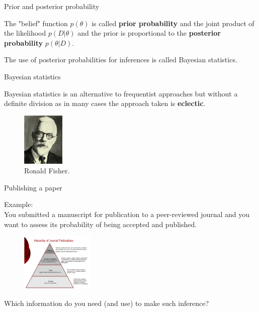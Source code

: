 \begin{frame}{Prior and posterior probability}

	\begin{block}{}
		The "belief" function $p(\theta)$ is called \textbf{prior probability} and the 
		joint product of the likelihood $p(D|\theta)$ and the prior is proportional 
		to the \textbf{posterior probability} $p(\theta|D)$.
	\end{block}

	\begin{block}{}
		The use of posterior probabilities for inferences is called Bayesian statistics.
	\end{block}

\end{frame}

\begin{frame}{Bayesian statistics}

	Bayesian statistics is an alternative to frequentist approaches but without a definite division as in many cases 
	the approach taken is \textbf{eclectic}.

	\begin{figure}[!ht]
		\includegraphics[width=2cm]{Images/Ronald_Fisher.jpg}
		\caption{Ronald Fisher.}
	\end{figure}

\end{frame}

\begin{frame}{Publishing a paper}

	Example:\\
	You submitted a manuscript for publication to a peer-reviewed journal and you want to assess its probability 
	of being accepted and published.

	\begin{figure}[!ht]
         	\includegraphics[width=3.5cm]{Images/journals.png}
        \end{figure}

	Which information do you need (and use) to make such inference?

\end{frame}


